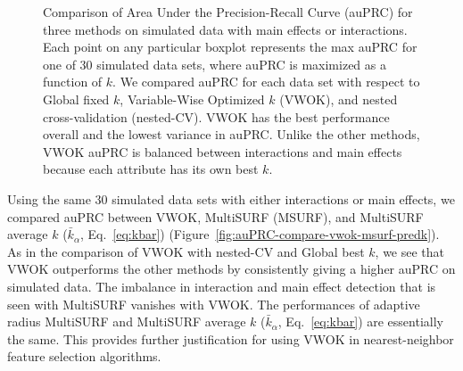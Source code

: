 \documentclass[10pt,letterpaper]{article}
\begin{document}
\begin{figure}[!bht]
	\caption{Comparison of Area Under the Precision-Recall Curve (auPRC) for three methods on simulated data with main effects or interactions. Each point on any particular boxplot represents the max auPRC for one of 30 simulated data sets, where auPRC is maximized as a function of $k$. We compared auPRC for each data set with respect to Global fixed $k$, Variable-Wise Optimized $k$ (VWOK), and nested cross-validation (nested-CV). VWOK has the best performance overall and the lowest variance in auPRC. Unlike the other methods, VWOK auPRC is balanced between interactions and main effects because each attribute has its own best $k$.}\label{fig:auPRC-compare-global-vwok-nCV}
\end{figure}

Using the same 30 simulated data sets with either interactions or main effects, we compared auPRC between VWOK, MultiSURF (MSURF), and MultiSURF average $k$ ($\bar{k}_\alpha$, Eq.~\ref{eq:kbar}) (Figure~\ref{fig:auPRC-compare-vwok-msurf-predk}). As in the comparison of VWOK with nested-CV and Global best $k$, we see that VWOK outperforms the other methods by consistently giving a higher auPRC on simulated data. The imbalance in interaction and main effect detection that is seen with MultiSURF vanishes with VWOK. The performances of adaptive radius MultiSURF and MultiSURF average $k$ ($\bar{k}_\alpha$, Eq.~\ref{eq:kbar}) are essentially the same. This provides further justification for using VWOK in nearest-neighbor feature selection algorithms.
\end{document}
